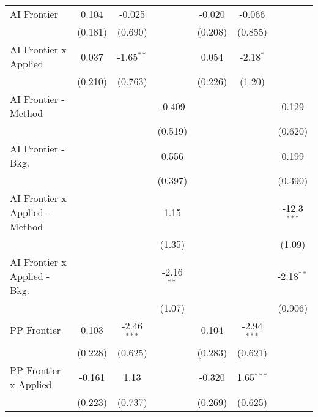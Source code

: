 \begin{tabular}{lcccccc}
   AI Frontier                    & 0.104         & -0.025        &              & -0.020        & -0.066        &   \\   
                                  & (0.181)       & (0.690)       &              & (0.208)       & (0.855)       &   \\   
   AI Frontier x Applied          & 0.037         & -1.65$^{**}$  &              & 0.054         & -2.18$^{*}$   &   \\   
                                  & (0.210)       & (0.763)       &              & (0.226)       & (1.20)        &   \\   
   AI Frontier - Method           &               &               & -0.409       &               &               & 0.129\\   
                                  &               &               & (0.519)      &               &               & (0.620)\\   
   AI Frontier - Bkg.             &               &               & 0.556        &               &               & 0.199\\   
                                  &               &               & (0.397)      &               &               & (0.390)\\   
   AI Frontier x Applied - Method &               &               & 1.15         &               &               & -12.3$^{***}$\\   
                                  &               &               & (1.35)       &               &               & (1.09)\\   
   AI Frontier x Applied - Bkg.   &               &               & -2.16$^{**}$ &               &               & -2.18$^{**}$\\   
                                  &               &               & (1.07)       &               &               & (0.906)\\   
   PP Frontier                    & 0.103         & -2.46$^{***}$ &              & 0.104         & -2.94$^{***}$ &   \\   
                                  & (0.228)       & (0.625)       &              & (0.283)       & (0.621)       &   \\   
   PP Frontier x Applied          & -0.161        & 1.13          &              & -0.320        & 1.65$^{***}$  &   \\   
                                  & (0.223)       & (0.737)       &              & (0.269)       & (0.625)       &   \\   

\end{tabular}
